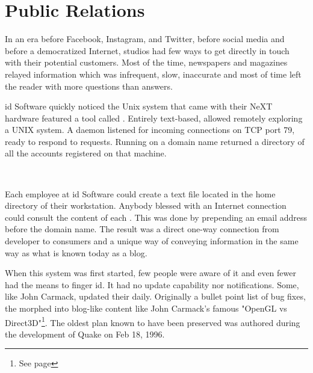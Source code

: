 \section{Public Relations}
In an era before Facebook, Instagram, and Twitter, before social media and before a democratized Internet, studios had few ways to get directly in touch with their potential customers. Most of the time, newspapers and magazines relayed information which was infrequent, slow, inaccurate and most of time left the reader with more questions than answers.


id Software quickly noticed the Unix system that came with their NeXT hardware featured a tool called . Entirely text-based,  allowed remotely exploring a UNIX system. A  daemon listened for incoming connections on TCP port 79, ready to respond to requests. Running  on a domain name returned a directory of all the accounts registered on that machine.\\
\par
{}
\par
{}\\
\par

Each employee at id Software could create a  text file located in the home directory of their \NeXT workstation. Anybody blessed with an Internet connection could consult the content of each . This was done by prepending an email address before the domain name. The result was a direct one-way connection from developer to consumers and a unique way of conveying information in the same way as what is known today as a blog.\\
\par
When this system was first started, few people were aware of it and even fewer had the means to finger id. It had no update capability nor notifications. Some, like John Carmack, updated their  daily. Originally a bullet point list of bug fixes, the  morphed into blog-like content like John Carmack's famous "OpenGL vs Direct3D"\footnote{See page \pageref{openglvsdirectd}}. The oldest plan known to have been preserved was authored during the development of Quake on Feb 18, 1996.



